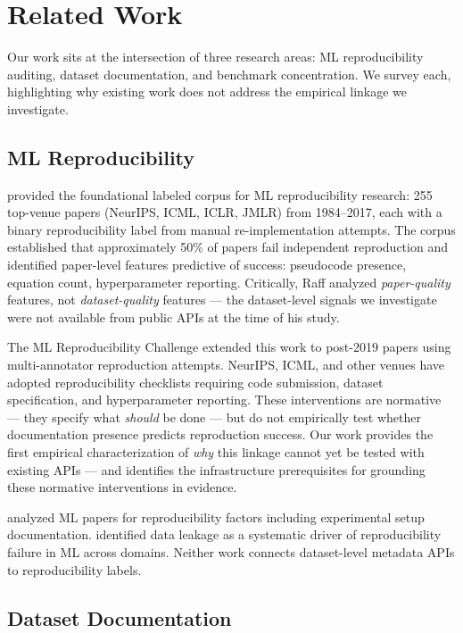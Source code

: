 \section{Related Work}
\label{sec:related}

Our work sits at the intersection of three research areas: ML reproducibility auditing, dataset documentation, and benchmark concentration. We survey each, highlighting why existing work does not address the empirical linkage we investigate.

\subsection{ML Reproducibility}

\citet{Raff2019Step} provided the foundational labeled corpus for ML reproducibility research: 255 top-venue papers (NeurIPS, ICML, ICLR, JMLR) from 1984--2017, each with a binary reproducibility label from manual re-implementation attempts. The corpus established that approximately 50\% of papers fail independent reproduction and identified paper-level features predictive of success: pseudocode presence, equation count, hyperparameter reporting. Critically, Raff analyzed \emph{paper-quality} features, not \emph{dataset-quality} features --- the dataset-level signals we investigate were not available from public APIs at the time of his study.

The ML Reproducibility Challenge \citep{Pineau2021Improving} extended this work to post-2019 papers using multi-annotator reproduction attempts. NeurIPS, ICML, and other venues have adopted reproducibility checklists requiring code submission, dataset specification, and hyperparameter reporting. These interventions are normative --- they specify what \emph{should} be done --- but do not empirically test whether documentation presence predicts reproduction success. Our work provides the first empirical characterization of \emph{why} this linkage cannot yet be tested with existing APIs --- and identifies the infrastructure prerequisites for grounding these normative interventions in evidence.

\citet{Gundersen2018State} analyzed ML papers for reproducibility factors including experimental setup documentation. \citet{Kapoor2023Leakage} identified data leakage as a systematic driver of reproducibility failure in ML across domains. Neither work connects dataset-level metadata APIs to reproducibility labels.

\subsection{Dataset Documentation}


